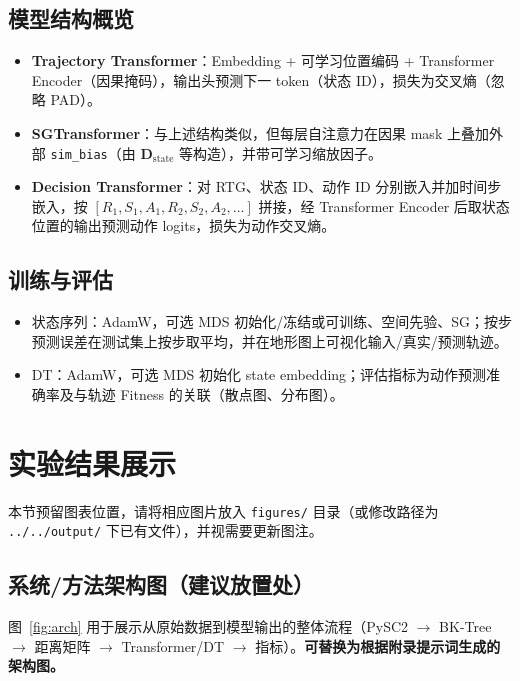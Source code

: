 \documentclass[UTF8,11pt]{ctexart}
\begin{document}
\subsection{模型结构概览}
\begin{itemize}[leftmargin=*]
    \item \textbf{Trajectory Transformer}：Embedding + 可学习位置编码 + Transformer Encoder（因果掩码），输出头预测下一 token（状态 ID），损失为交叉熵（忽略 PAD）。
    \item \textbf{SGTransformer}：与上述结构类似，但每层自注意力在因果 mask 上叠加外部 \texttt{sim\_bias}（由 $\mathbf{D}_{\mathrm{state}}$ 等构造），并带可学习缩放因子。
    \item \textbf{Decision Transformer}：对 RTG、状态 ID、动作 ID 分别嵌入并加时间步嵌入，按 $[R_1,S_1,A_1,R_2,S_2,A_2,\ldots]$ 拼接，经 Transformer Encoder 后取状态位置的输出预测动作 logits，损失为动作交叉熵。
\end{itemize}

\subsection{训练与评估}
\begin{itemize}[leftmargin=*]
    \item 状态序列：AdamW，可选 MDS 初始化/冻结或可训练、空间先验、SG；按步预测误差在测试集上按步取平均，并在地形图上可视化输入/真实/预测轨迹。
    \item DT：AdamW，可选 MDS 初始化 state embedding；评估指标为动作预测准确率及与轨迹 Fitness 的关联（散点图、分布图）。
\end{itemize}

\vspace{0.5em}

\section{实验结果展示}
\label{sec:experiments}

本节预留图表位置，请将相应图片放入 \texttt{figures/} 目录（或修改路径为 \texttt{../../output/} 下已有文件），并视需要更新图注。

\subsection{系统/方法架构图（建议放置处）}
图~\ref{fig:arch} 用于展示从原始数据到模型输出的整体流程（PySC2 $\to$ BK-Tree $\to$ 距离矩阵 $\to$ Transformer/DT $\to$ 指标）。\textbf{可替换为根据附录提示词生成的架构图。}
\end{document}
